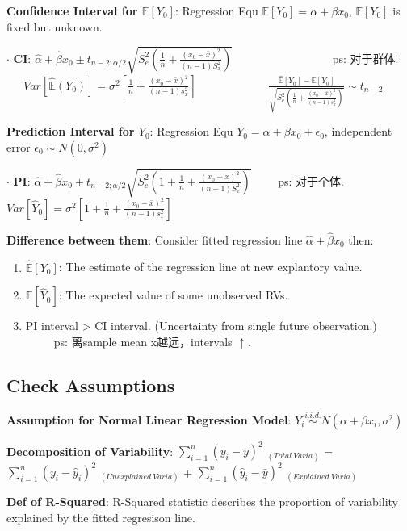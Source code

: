 \documentclass[9pt]{article}
\begin{document}
    \textbf{Confidence Interval for $\mathbb{E}[Y_0]$}: Regression Equ $\mathbb{E}[Y_0]=\alpha+\beta x_0$, $\mathbb{E}[Y_0]$ is fixed but unknown.

$\cdot$ \textbf{CI}: $\hat{\alpha}+\hat{\beta}x_0\pm t_{n-2;\alpha/2}\sqrt{S^2_e(\frac{1}{n}+\frac{(x_0-\bar{x})^2}{(n-1)S^2_x})}$  \ \ \ \ \ \ \ \ \ \ \ \ \ \ \ \ \ ps: 对于群体. \ \ \ $Var[\hat{\mathbb{E}}(Y_0)]=\sigma^2[\frac{1}{n}+\frac{(x_0-\bar{x})^2}{(n-1)s^2_x}]$ \ \ \ \ \ \ \ \ \ \ \ \ $\frac{\hat{\mathbb{E}}[Y_0]-\mathbb{E}[Y_0]}{\sqrt{S_e^2(\frac{1}{n}+\frac{(x_0-\bar{x})^2}{(n-1)s^2_x})}}\sim t_{n-2}$

    \textbf{Prediction Interval for $Y_0$}: Regression Equ $Y_0=\alpha+\beta x_0+\epsilon_0$, independent error $\epsilon_0\sim N(0,\sigma^2)$

$\cdot$ \textbf{PI}: $\hat{\alpha}+\hat{\beta}x_0\pm t_{n-2;\alpha/2}\sqrt{S^2_e(1+\frac{1}{n}+\frac{(x_0-\bar{x})^2}{(n-1)S^2_x})}$ \ \ \ \ ps: 对于个体. \ \ \ $Var[\hat{Y}_0]=\sigma^2[1+\frac{1}{n}+\frac{(x_0-\bar{x})^2}{(n-1)s^2_x}]$

    \textbf{Difference between them}: Consider fitted regression line $\hat{\alpha}+\hat{\beta}x_0$ then:
    \begin{enumerate}[itemsep=-2pt, topsep=-2pt]
        \item $\hat{\mathbb{E}}[Y_0]$: The estimate of the regression line at new explantory value.
        \item $\mathbb{E}[\hat{Y}_0]$: The expected value of some unobserved RVs.
        \item PI interval > CI interval. (Uncertainty from single future observation.) \ \ \ \ \ ps: 离sample mean x越远，intervals $\uparrow$.
    \end{enumerate}

    \subsection{Check Assumptions}

    \textbf{Assumption for Normal Linear Regression Model}:  $Y_i\stackrel{i.i.d.}{\sim}N(\alpha+\beta x_i,\sigma^2)$

    \textbf{Decomposition of Variability}: $\sum^{n}_{i=1}(y_i-\bar{y})^2$ $_{(Total \ Varia)}$ = $\sum^{n}_{i=1}(y_i-\hat{y}_i)^2$ $_{(Unexplained \ Varia)}$ + $\sum^{n}_{i=1}(\hat{y}_i-\bar{y})^2$ $_{(Explained \ Varia)}$

    \textbf{Def of R-Squared}: R-Squared statistic describes the proportion of variability explained by the fitted regresison line.
\end{document}
